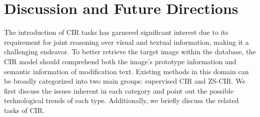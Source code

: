 
\label{sec:dis}
\section{Discussion and Future Directions}
The introduction of CIR tasks has garnered significant interest due to its requirement for joint reasoning over visual and textual information, making it a challenging endeavor. To better retrieve the target image within the database, the CIR model should comprehend both the image's prototype information and semantic information of modification text. Existing methods in this domain can be broadly categorized into two main groups: supervised CIR and ZS-CIR. We first discuss the issues inherent in each category and point out the possible technological trends of each type. Additionally, we briefly discuss the related tasks of CIR. 

